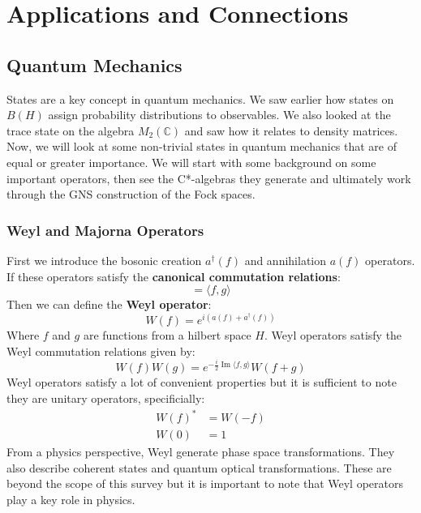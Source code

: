 \section{Applications and Connections}
\subsection{Quantum Mechanics}
States are a key concept in quantum mechanics. We saw earlier how states on $B(H)$
assign probability distributions to observables. We also looked at the trace state
on the algebra $M_2(\mathbb{C})$ and saw how it relates to density matrices. Now,
we will look at some non-trivial states in quantum mechanics that are of equal
or greater importance. We will start with some background on some important operators,
then see the C*-algebras they generate and ultimately work through the GNS construction
of the Fock spaces.
\subsubsection{Weyl and Majorna Operators}
First we introduce the bosonic creation $a^\dagger(f)$ and annihilation $a(f)$ operators.
If these operators satisfy the \textbf{canonical commutation relations}:
\begin{equation}
    [ a(f), a^\dagger(g) ] = \langle f,g \rangle
\end{equation}
Then we can define the \textbf{Weyl operator}:
\begin{equation}
    W(f) = e^{i(a(f)+a^\dagger(f))}
\end{equation}
Where $f$ and $g$ are functions from a hilbert space $H$. Weyl operators satisfy
the Weyl commutation relations given by:
\begin{equation}
    W(f) W(g) = e^{-\frac{i}{2} \operatorname{Im} \langle f, g \rangle} W(f+g)
\end{equation}
Weyl operators satisfy a lot of convenient properties but it is sufficient to note they
are unitary operators, specificially:
\begin{align*}
    W(f)^* &= W(-f)\\
    W(0) &= 1
\end{align*}
From a physics perspective, Weyl generate phase space transformations. They also
describe coherent states and quantum optical transformations. These are beyond the 
scope of this survey but it is important to note that Weyl operators play a key
role in physics.\newline


